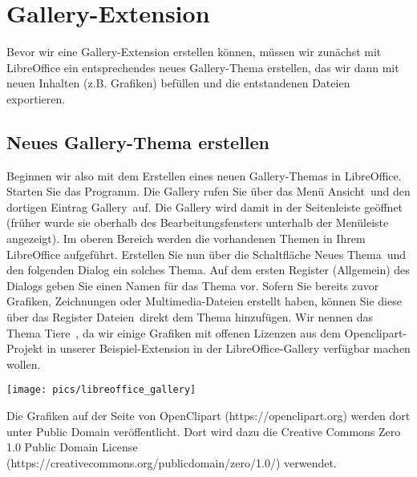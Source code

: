 \documentclass[a4paper,10pt,pagesize,titlepage]{scrbook}
\begin{document}
\section{Gallery-Extension}

Bevor wir eine Gallery-Extension erstellen können, müssen wir zunächst mit LibreOffice ein entsprechendes neues Gallery-Thema erstellen, das wir dann mit neuen Inhalten (z.B. Grafiken) befüllen und die entstandenen Dateien exportieren.

\subsection{Neues Gallery-Thema erstellen}

Beginnen wir also mit dem Erstellen eines neuen Gallery-Themas in LibreOffice. Starten Sie das Programm. Die Gallery rufen Sie über das Menü \glqq Ansicht\grqq~und den dortigen Eintrag \glqq Gallery\grqq~auf. Die Gallery wird damit in der Seitenleiste geöffnet (früher wurde sie oberhalb des Bearbeitungsfensters unterhalb der Menüleiste angezeigt). Im oberen Bereich werden die vorhandenen Themen in Ihrem LibreOffice aufgeführt. Erstellen Sie nun über die Schaltfläche \glqq Neues Thema\grqq~und den folgenden Dialog ein solches Thema. Auf dem ersten Register (\glqq Allgemein\grqq) des Dialogs geben Sie einen Namen für das Thema vor. Sofern Sie bereits zuvor Grafiken, Zeichnungen oder Multimedia-Dateien erstellt haben, können Sie diese über das Register \glqq Dateien\grqq~direkt dem Thema hinzufügen. Wir nennen das Thema \glqq Tiere\grqq~, da wir einige Grafiken mit offenen Lizenzen aus dem Openclipart-Projekt in unserer Beispiel-Extension in der LibreOffice-Gallery verfügbar machen wollen.

\begin{center}
	\captionsetup{type=figure}
	\texttt{[image: pics/libreoffice\_gallery]}
	\label{fig:libreoffice_gallery}
\end{center}


Die Grafiken auf der Seite von OpenClipart (https://openclipart.org) werden dort unter Public Domain veröffentlicht. Dort wird dazu die Creative Commons Zero 1.0 Public Domain License (https://creativecommons.org/publicdomain/zero/1.0/) verwendet.
\end{document}
